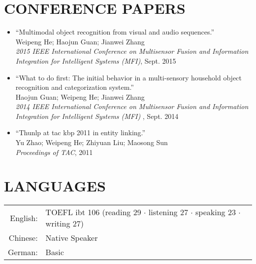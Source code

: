\documentclass[a4paper,11pt]{article} %
\begin{document}

\section{CONFERENCE PAPERS}
\begin{itemize}
  \item ``Multimodal object recognition from visual and audio sequences.'' \\
    Weipeng He; Haojun Guan; Jianwei Zhang \\
    \textit{2015 IEEE International Conference on Multisensor Fusion and Information Integration for Intelligent Systems (MFI)}, Sept. 2015 

  \item ``What to do first: The initial behavior in a multi-sensory household object recognition and categorization system.'' \\
    Haojun Guan; Weipeng He; Jianwei Zhang \\
    \textit{2014 IEEE International Conference on Multisensor Fusion and Information Integration for Intelligent Systems (MFI)} , Sept. 2014

  \item ``Thunlp at tac kbp 2011 in entity linking.'' \\
    Yu Zhao; Weipeng He; Zhiyuan Liu; Maosong Sun \\
    \textit{Proceedings of TAC}, 2011
\end{itemize}


\section{LANGUAGES}

\begin{tabular}{rl}
  English: & TOEFL ibt 106 (reading 29 $\cdotp$ listening 27 $\cdotp$ speaking 23 $\cdotp$ writing 27) \\
  Chinese: & Native Speaker \\
  German: & Basic \\
\end{tabular}
\end{document}
